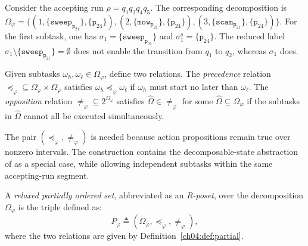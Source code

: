 \begin{example}
\label{ch04:example:subtask}
Consider the accepting run
$\rho=q_{1}q_{2}q_{4}q_{5}$. The corresponding decomposition is
$\Omega_{\varphi}=
\bigl\{
(1,\{\texttt{sweep}_{\texttt{p}_{21}}\},\{\texttt{p}_{24}\}),
(2,\{\texttt{mow}_{\texttt{p}_{21}}\},\{\texttt{p}_{24}\}),
(3,\{\texttt{scan}_{\texttt{p}_{21}}\},\{\texttt{p}_{24}\})
\bigr\}$.
For the first subtask, one has
$\sigma_{1}=\{\texttt{sweep}_{\texttt{p}_{21}}\}$ and
$\sigma_{1}^{s}=\{\texttt{p}_{24}\}$. The reduced label
$\sigma_{1}\setminus\{\texttt{sweep}_{\texttt{p}_{21}}\}=\emptyset$ does not
enable the transition from $q_{1}$ to $q_{2}$, whereas $\sigma_{1}$ does.
\end{example}

\begin{definition}
\label{ch04:def:partial}
Given subtasks $\omega_{h},\omega_{\ell}\in\Omega_{\varphi}$, define two
relations. The \emph{precedence} relation
$\preceq_{\varphi}\subseteq
\Omega_{\varphi}\times\Omega_{\varphi}$ satisfies
$\omega_{h}\preceq_{\varphi}\omega_{\ell}$ if
$\omega_{h}$ must start no later than $\omega_{\ell}$.
The \emph{opposition} relation
$\neq_{\varphi}\subseteq 2^{\Omega_{\varphi}}$ satisfies
$\widehat{\Omega}\in\neq_{\varphi}$ for some
$\widehat{\Omega}\subseteq\Omega_{\varphi}$ if the subtasks in
$\widehat{\Omega}$ cannot all be executed simultaneously.
\end{definition}

The pair $(\preceq_{\varphi},\neq_{\varphi})$ is needed because action
propositions remain true over nonzero intervals.  The
construction contains the decomposable-state abstraction of
\citet{schillinger2018simultaneous} as a special case, while allowing independent
subtasks within the same accepting-run segment.

\begin{definition}
\label{ch04:def:poset}
A \emph{relaxed partially ordered set}, abbreviated as an \emph{R-poset},
over the decomposition $\Omega_{\varphi}$ is the triple defined as:
\begin{equation}
\label{ch04:eq:poset}
P_{\varphi}\triangleq
(\Omega_{\varphi},\preceq_{\varphi},\neq_{\varphi}),
\end{equation}
where the two relations are given by
Definition~\ref{ch04:def:partial}.
\end{definition}


